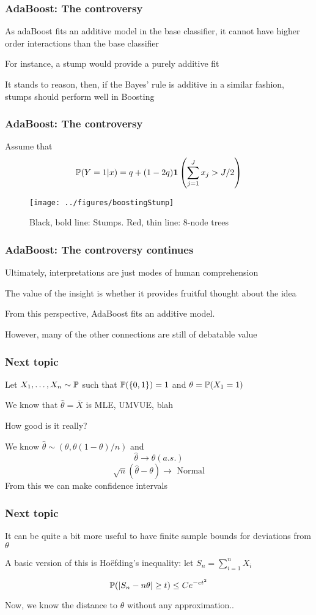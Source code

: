 \documentclass[12pt]{beamer}
\begin{document}
\begin{frame}[fragile]
\frametitle{AdaBoost: The controversy}
As adaBoost fits an additive model in the base classifier, it cannot have higher order interactions than the 
base classifier

\vsp
For instance, a stump would provide a purely additive fit


\vsp
It stands to reason, then, if the Bayes' rule is additive in a similar fashion, stumps should perform well in Boosting
\end{frame}


\begin{frame}[fragile]
\frametitle{AdaBoost: The controversy}
Assume that 
\[
\P(Y = 1|x) = q + (1-2q) \mathbf{1}\left( \sum_{j=1}^J x_j > J/2 \right)
\]
\begin{figure}
\centering
\texttt{[image: ../figures/boostingStump]}
\caption{Black, bold line: Stumps.  Red, thin line: 8-node trees}
\end{figure}
\end{frame}


\begin{frame}[fragile]
\frametitle{AdaBoost: The controversy continues}
Ultimately, interpretations are just modes of human comprehension

\vsp
The value of the insight is whether it provides fruitful thought about the idea

\vsp
From this perspective, AdaBoost fits an additive model.  

\vsp
However, many of the other connections are still of debatable value

\end{frame}

\begin{frame}[fragile]
\frametitle{Next topic}
Let $X_1,\ldots,X_n \sim \P$ such that $\P(\{0,1\}) = 1$ and $\theta = \P(X_1 = 1)$

\vsp
We know that $\hat\theta = \overline{X}$ is MLE, UMVUE, blah

\vsp
How good is it really?

\vsp
We know $\hat{\theta} \sim (\theta, \theta(1-\theta)/n)$ and
\[
\hat\theta \rightarrow \theta (a.s.)
\]
\[
\sqrt{n}(\hat\theta - \theta) \rightarrow \textrm{ Normal}
\]
From this we can make confidence intervals 
\end{frame}

\begin{frame}[fragile]
\frametitle{Next topic}
It can be quite a bit more useful to have finite sample bounds for deviations from $\theta$

\vsp
A basic version of this is Ho\"efding's inequality: let $S_n = \sum_{i=1}^n X_i$

\[
\P( |S_n - n\theta| \geq t ) \leq Ce^{-ct^2}
\]

\vsp
Now, we know the distance to $\theta$ without any approximation..
\end{frame}
\end{document}
